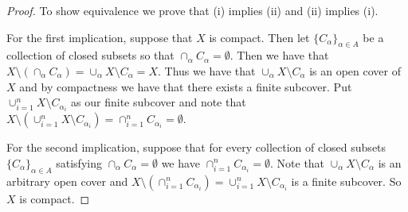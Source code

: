 \documentclass[leqno]{article}
\theoremstyle{nonumberplain}
\newtheorem{proof}{Proof}
\begin{document}
\begin{proof}
To show equivalence we prove that (i) implies (ii) and (ii) implies (i).  

For the first implication, suppose that $X$ is compact. Then let $\{C_\alpha\}_{\alpha \in A}$ be a collection of closed subsets so that $\cap_{\alpha} C_\alpha=\emptyset$. Then we have that $X\setminus (\cap_{\alpha} C_\alpha)=\cup_\alpha X\setminus C_\alpha = X$.  Thus we have that $\cup_\alpha X\setminus C_\alpha$ is an open cover of $X$ and by compactness we have that there exists a finite subcover. Put $\cup_{i=1}^n X\setminus C_{\alpha_i}$ as our finite subcover and note that $X\setminus (\cup_{i=1}^n X\setminus C_{\alpha_i}) = \cap_{i=1}^n C_{\alpha_i} = \emptyset$. 

For the second implication, suppose that for every collection of closed subsets $\{C_\alpha\}_{\alpha \in A}$ satisfying $\cap_{\alpha} C_\alpha = \emptyset$ we have $\cap_{i=1}^n C_{\alpha_i} = \emptyset$. Note that $\cup_\alpha X\setminus C_\alpha$ is an arbitrary open cover and $X\setminus (\cap_{i=1}^n C_{\alpha_i})=\cup_{i=1}^n X\setminus C_{\alpha_i}$ is a finite subcover. So $X$ is compact.
\end{proof}


\pagebreak
\end{document}
